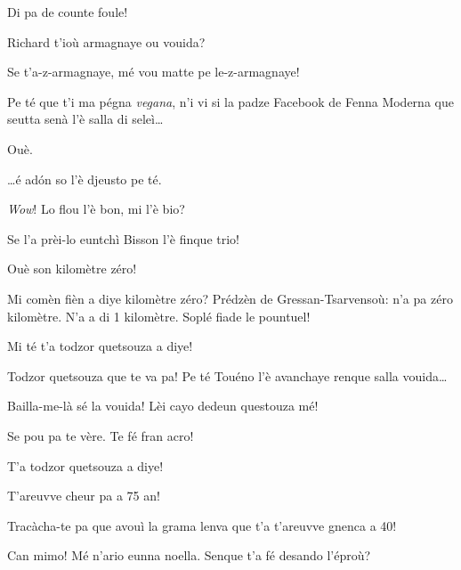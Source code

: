 \begin{drama}
\Spritzspeaks{} Di pa de counte foule!


\Saventaspeaks{} Richard t'ioù armagnaye ou vouida?

\Richardspeaks Se t'a-z-armagnaye, mé vou matte pe le-z-armagnaye!


\Saventaspeaks{} Pe té que t'i ma pégna \textit{vegana}, n'i vi si la padze Facebook de Fenna Moderna que seutta senà l'è salla di seleì\ldots

\Gerominespeaks Ouè.

\Saventaspeaks \ldots é ad\'on so l'è djeusto pe té.


\Gerominespeaks \textit{Wow}!  Lo flou l'è bon, mi l'è bio?

\Tuenospeaks Se l'a prèi-lo euntchì Bisson l'è finque trio!

\Saventaspeaks Ouè son kilomètre zéro!

\Richardspeaks Mi comèn fièn a diye kilomètre zéro? Prédzèn de Gressan-Tsarvensoù: n'a pa zéro kilomètre. N'a a di 1 kilomètre. Soplé fiade le pountuel!

\Tuenospeaks{} Mi té t'a todzor quetsouza a diye! 

\Saventaspeaks{} Todzor quetsouza que te va pa! Pe té Touéno l’è avanchaye renque salla vouida\ldots

\Tuenospeaks Bailla-me-là sé la vouida! Lèi cayo dedeun questouza mé!



\Richardspeaks{} Se pou pa te vère. Te fé fran acro!

\Tuenospeaks T'a todzor quetsouza a diye!

\Richardspeaks T'areuvve cheur pa a 75 an!

\Tuenospeaks Tracàcha-te pa que avouì la grama lenva que t'a t'areuvve gnenca a 40!

\scene[-- Si pe Comboé]

\Saventaspeaks Can mimo! Mé n'ario eunna noella.  Senque t'a fé desando l'éproù?


\end{drama}
